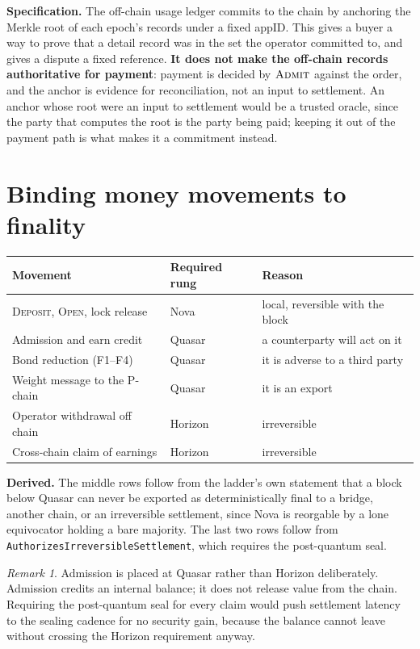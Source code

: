 \documentclass[11pt,a4paper]{article}
\theoremstyle{definition}
\theoremstyle{remark}
\newtheorem{remark}{Remark}[section]
\newcommand{\code}[1]{\texttt{#1}}
\newcommand{\Admit}{\textsc{Admit}}
\begin{document}
\textbf{Specification.} The off-chain usage ledger commits to the chain by
anchoring the Merkle root of each epoch's records under a fixed appID. This gives
a buyer a way to prove that a detail record was in the set the operator
committed to, and gives a dispute a fixed reference. \textbf{It does not make the
off-chain records authoritative for payment}: payment is decided by
$\Admit$ against the order, and the anchor is evidence for reconciliation, not
an input to settlement. An anchor whose root were an input to settlement would
be a trusted oracle, since the party that computes the root is the party being
paid; keeping it out of the payment path is what makes it a commitment instead.

\section{Binding money movements to finality}
\label{sec:finality}

\begin{center}
\begin{tabular}{@{}lll@{}}
\toprule
Movement & Required rung & Reason \\
\midrule
\textsc{Deposit}, \textsc{Open}, lock release & Nova & local, reversible with the block \\
Admission and $\mathrm{earn}$ credit & Quasar & a counterparty will act on it \\
Bond reduction (F1--F4) & Quasar & it is adverse to a third party \\
Weight message to the P-chain & Quasar & it is an export \\
Operator withdrawal off chain & Horizon & irreversible \\
Cross-chain claim of earnings & Horizon & irreversible \\
\bottomrule
\end{tabular}
\end{center}

\textbf{Derived.} The middle rows follow from the ladder's own statement that a
block below Quasar can never be exported as deterministically final to a bridge,
another chain, or an irreversible settlement, since Nova is reorgable by a lone
equivocator holding a bare majority. The last two rows follow from
\code{AuthorizesIrreversibleSettlement}, which requires the post-quantum seal.

\begin{remark}
Admission is placed at Quasar rather than Horizon deliberately. Admission
credits an internal balance; it does not release value from the chain. Requiring
the post-quantum seal for every claim would push settlement latency to the
sealing cadence for no security gain, because the balance cannot leave without
crossing the Horizon requirement anyway.
\end{remark}
\end{document}
